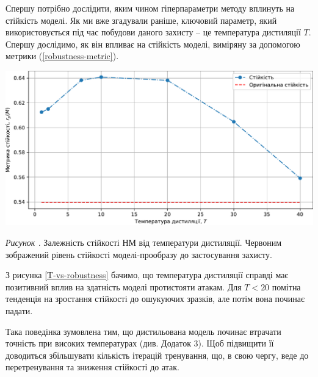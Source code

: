 \documentclass[14pt,a4paper]{extarticle}
\newcounter{e}
\newcounter{pic}
\newcommand{\pic}[1]{\refstepcounter{pic} \vspace{-0.3cm}\textit{Рисунок \arabic{pic}\label{#1}.}}
\numberwithin{equation}{section}
\numberwithin{figure}{section}
\begin{document}
 Спершу потрібно дослідити, яким чином гіперпараметри методу вплинуть на стійкість моделі. Як ми вже згадували раніше, ключовий параметр, який використовується під час побудови даного захисту -- це температура дистиляції $T$. Спершу дослідимо, як він впливає на стійкість моделі, виміряну за допомогою метрики (\ref{robustness-metric}).
 
 \begin{center}
 	\includegraphics[width=17cm]{../images/robustness.pdf}
 \end{center}
 \begin{center}
 	\pic{T-vs-robustness} Залежність стійкості НМ від температури дистиляції. Червоним зображений рівень стійкості моделі-прообразу до застосування захисту.
 \end{center}
 
 З рисунка \ref{T-vs-robustness} бачимо, що температура дистиляції справді має позитивний вплив на здатність моделі протистояти атакам. Для $T<20$ помітна тенденція на зростання стійкості до ошукуючих зразків, але потім вона починає падати. 
 
 Така поведінка зумовлена тим, що дистильована модель починає втрачати точність при високих температурах (див. Додаток 3). Щоб підвищити її доводиться збільшувати кількість ітерацій тренування, що, в свою чергу, веде до перетренування та зниження стійкості до атак.
 
\end{document}

